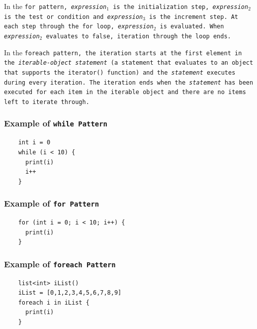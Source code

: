 \documentclass{article}
\begin{document}
In the \tt for \rm pattern, \emph{expression}$_1$ is the initialization step,
\emph{expression}$_2$ is the test or condition and \emph{expression}$_3$ is the
increment step. At each step through the for loop, \emph{expression}$_2$ is
evaluated. When \emph{expression}$_2$ evaluates to false, iteration through the
loop ends.

In the \tt foreach \rm pattern, the iteration starts at the first element in the
\emph{iterable-object statement} (a statement that evaluates to an object that
supports the \tt iterator() \rm function) and the \emph{statement} executes during
every iteration. The iteration ends when the \emph{statement} has been executed
for each item in the iterable object and there are no items left to iterate
through.

\subsubsection{Example of \tt while \rm \textbf{Pattern}} %
\label{ssub:example_1}

\begin{verbatim}
    int i = 0
    while (i < 10) {
      print(i)
      i++
    }
\end{verbatim}


\subsubsection{Example of \tt for \rm \textbf{Pattern}} %
\label{ssub:example_2}

\begin{verbatim}
    for (int i = 0; i < 10; i++) {
      print(i)
    }
\end{verbatim}


\subsubsection{Example of \tt foreach \rm \textbf{Pattern}} %
\label{ssub:example_3}

\begin{verbatim}
    list<int> iList()
    iList = [0,1,2,3,4,5,6,7,8,9]
    foreach i in iList {
      print(i)
    }
\end{verbatim}


\end{document}
